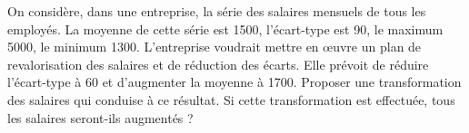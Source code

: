 
\begin{exercice}\label{exosmath-0248}

On considère, dans une entreprise, la série des salaires mensuels de tous les employés.  La moyenne de cette série est 1500, l'écart-type est 90, le maximum 5000, le minimum 1300.  L'entreprise voudrait mettre en œuvre un plan de revalorisation des salaires et de réduction des écarts.  Elle prévoit de réduire l'écart-type à 60 et d'augmenter la moyenne à 1700.  Proposer une transformation des salaires qui conduise à ce résultat. Si cette transformation est effectuée, tous les salaires seront-ils augmentés ?


\end{exercice}
